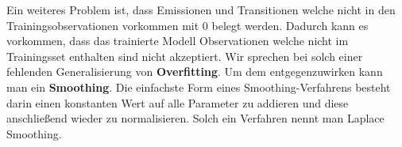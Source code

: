 Ein weiteres Problem ist, dass Emissionen und Transitionen welche nicht in den Trainingsobservationen vorkommen mit 0 belegt werden. Dadurch kann es vorkommen, dass das trainierte Modell Observationen welche nicht im Trainingsset enthalten sind nicht akzeptiert. Wir sprechen bei solch einer fehlenden Generalisierung von \textbf{Overfitting}. Um dem entgegenzuwirken kann man ein \textbf{Smoothing}. Die einfachste Form eines Smoothing-Verfahrens besteht darin einen konstanten Wert auf alle Parameter zu addieren und diese anschließend wieder zu normalisieren. Solch ein Verfahren nennt man Laplace Smoothing. 